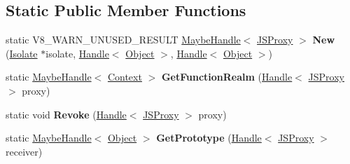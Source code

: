 \subsection*{Static Public Member Functions}
\begin{DoxyCompactItemize}
\item 
\mbox{\label{classv8_1_1internal_1_1JSProxy_ac70b136605f3c2cd716aae1423f07bb7}} 
static V8\+\_\+\+W\+A\+R\+N\+\_\+\+U\+N\+U\+S\+E\+D\+\_\+\+R\+E\+S\+U\+LT \mbox{\hyperlink{classv8_1_1internal_1_1MaybeHandle}{Maybe\+Handle}}$<$ \mbox{\hyperlink{classv8_1_1internal_1_1JSProxy}{J\+S\+Proxy}} $>$ {\bfseries New} (\mbox{\hyperlink{classv8_1_1internal_1_1Isolate}{Isolate}} $\ast$isolate, \mbox{\hyperlink{classv8_1_1internal_1_1Handle}{Handle}}$<$ \mbox{\hyperlink{classv8_1_1internal_1_1Object}{Object}} $>$, \mbox{\hyperlink{classv8_1_1internal_1_1Handle}{Handle}}$<$ \mbox{\hyperlink{classv8_1_1internal_1_1Object}{Object}} $>$)
\item 
\mbox{\label{classv8_1_1internal_1_1JSProxy_ab84352a0ad60c6d2c0b975d7dc2fffab}} 
static \mbox{\hyperlink{classv8_1_1internal_1_1MaybeHandle}{Maybe\+Handle}}$<$ \mbox{\hyperlink{classv8_1_1internal_1_1Context}{Context}} $>$ {\bfseries Get\+Function\+Realm} (\mbox{\hyperlink{classv8_1_1internal_1_1Handle}{Handle}}$<$ \mbox{\hyperlink{classv8_1_1internal_1_1JSProxy}{J\+S\+Proxy}} $>$ proxy)
\item 
\mbox{\label{classv8_1_1internal_1_1JSProxy_ab9812cf07dabee2a0f3aa34deb8bec25}} 
static void {\bfseries Revoke} (\mbox{\hyperlink{classv8_1_1internal_1_1Handle}{Handle}}$<$ \mbox{\hyperlink{classv8_1_1internal_1_1JSProxy}{J\+S\+Proxy}} $>$ proxy)
\item 
\mbox{\label{classv8_1_1internal_1_1JSProxy_a7db144a6742ed2b066f0d884297a7011}} 
static \mbox{\hyperlink{classv8_1_1internal_1_1MaybeHandle}{Maybe\+Handle}}$<$ \mbox{\hyperlink{classv8_1_1internal_1_1Object}{Object}} $>$ {\bfseries Get\+Prototype} (\mbox{\hyperlink{classv8_1_1internal_1_1Handle}{Handle}}$<$ \mbox{\hyperlink{classv8_1_1internal_1_1JSProxy}{J\+S\+Proxy}} $>$ receiver)
\item 
\mbox{\label{classv8_1_1internal_1_1JSProxy_af1db27185777188d52476cc6a6bdd17f}} 

\end{DoxyCompactItemize}
